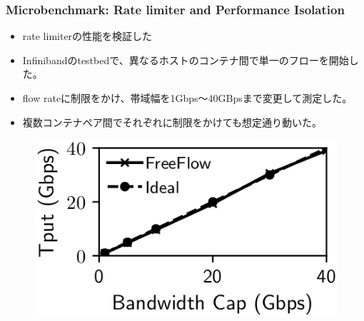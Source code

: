 \documentclass[dvipdfmx,9pt,notheorems]{beamer}
\theoremstyle{definition}
\begin{document}
\begin{frame}\frametitle{Microbenchmark: Rate limiter and Performance Isolation}
	\begin{itemize}
		\item rate limiterの性能を検証した
		\item Infinibandのtestbedで、異なるホストのコンテナ間で単一のフローを開始した。
		\item flow rateに制限をかけ、帯域幅を1Gbps〜40GBpsまで変更して測定した。
		\item 複数コンテナペア間でそれぞれに制限をかけても想定通り動いた。
	\end{itemize}
  \begin{figure}[htb]
    \centering
		\includegraphics[scale=1]{fig/figure13.png}
  \end{figure}
\end{frame}
\end{document}
